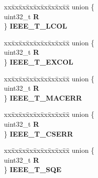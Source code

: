 \begin{DoxyCompactItemize}
\begin{tabbing}
\end{tabbing}\item 
\mbox{\label{structFEC__tag_a0090ed3452dd97725cbfa9d5a9a1c044}} 
\begin{tabbing}
xx\=xx\=xx\=xx\=xx\=xx\=xx\=xx\=xx\=\kill
union \{\\
\>uint32\_t {\bfseries R}\\
\} {\bfseries IEEE\_T\_LCOL}\\

\end{tabbing}\item 
\mbox{\label{structFEC__tag_a15318423928ada344917120e922cb6c8}} 
\begin{tabbing}
xx\=xx\=xx\=xx\=xx\=xx\=xx\=xx\=xx\=\kill
union \{\\
\>uint32\_t {\bfseries R}\\
\} {\bfseries IEEE\_T\_EXCOL}\\

\end{tabbing}\item 
\mbox{\label{structFEC__tag_ae46eb9d91132369deee67e4f7f93ba1a}} 
\begin{tabbing}
xx\=xx\=xx\=xx\=xx\=xx\=xx\=xx\=xx\=\kill
union \{\\
\>uint32\_t {\bfseries R}\\
\} {\bfseries IEEE\_T\_MACERR}\\

\end{tabbing}\item 
\mbox{\label{structFEC__tag_a75a4c8c6c2e8b16991a5461336b57aa1}} 
\begin{tabbing}
xx\=xx\=xx\=xx\=xx\=xx\=xx\=xx\=xx\=\kill
union \{\\
\>uint32\_t {\bfseries R}\\
\} {\bfseries IEEE\_T\_CSERR}\\

\end{tabbing}\item 
\mbox{\label{structFEC__tag_ac87b4c05ff0cc4689bb41f4aed048928}} 
\begin{tabbing}
xx\=xx\=xx\=xx\=xx\=xx\=xx\=xx\=xx\=\kill
union \{\\
\>uint32\_t {\bfseries R}\\
\} {\bfseries IEEE\_T\_SQE}\\


\end{tabbing}
\end{DoxyCompactItemize}
